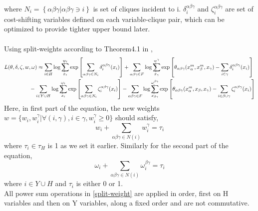 \documentclass{article}
\makeatletter
\newcommand{\avsum}{\mathop{\mathpalette\avsuminner\relax}\displaylimits}
\newcommand\avsuminner[2]{%
  {\sbox0{$\m@th#1\sum$}%
   \vphantom{\usebox0}%
   \ooalign{%
     \hidewidth
     \smash{\vrule height\dimexpr\ht0+1pt\relax depth\dimexpr\dp0+1pt\relax}%
     \hidewidth\cr
     $\m@th#1\sum$\cr
   }%
  }%
}
\makeatother
\begin{document}
where $N_i=\left\{ \alpha\beta\gamma | \alpha\beta\gamma \ni i \right\}$ is set of cliques incident to i. $\delta_i^{\alpha\beta\gamma}$ and $\zeta_i^{\alpha\beta\gamma}$ are set of cost-shifting variables defined on each variable-clique pair, which can be optimized to provide tighter upper bound later.\\\\
Using split-weights according to Theorem4.1 in \cite{Ping2015},
\begin{align}
 L(\theta,\delta,\zeta,w,\omega)&\approx \sum_{i\in H}\log\avsum_{x_i}^{w_i}\exp\left [ \sum_{\alpha\beta\gamma \in N_i} \delta_i^{\alpha\beta\gamma}(x_i)\right ] + \sum_{\alpha\beta\gamma \in F}\log\avsum_{x_{\gamma}}^{w^{\gamma}}\exp\left [\theta_{\alpha\beta\gamma}(x_{\alpha}^m,x_{\beta}^m,x_{\gamma})-\sum_{i\in \gamma}\delta_i^{\alpha\beta\gamma}(x_i) \right ] \nonumber \\ \label{split-weight}&\hspace{-5mm}- \sum_{i\in Y\cup H}\log\avsum_{x_i}^{\omega_i}\exp\left [ \sum_{\alpha\beta\gamma \in N_i} \zeta_i^{\alpha\beta\gamma}(x_i)\right ] - \sum_{\alpha\beta\gamma \in F}\log\avsum_{x_{\beta\gamma}}^{\omega^{\beta\gamma}}\exp\left [\theta_{\alpha\beta\gamma}(x_{\alpha}^m,x_{\beta},x_{\gamma})-\sum_{i\in \beta\cup \gamma}\zeta_i^{\alpha\beta\gamma}(x_i) \right ] 
\end{align}
Here, in first part of the equation, the new weights $w=\{w_i,w_i^{\gamma}|\forall(i,\gamma),i\in\gamma, w_i^{\gamma}\geq0\}$ should satisfy,
\begin{equation*}
w_i+\sum_{\alpha\beta\gamma\in N(i)}w_i^{\gamma}=\tau_i
\end{equation*}
where $\tau_i\in \tau_H$ is 1 as we set it earlier. Similarly for the second part of the equation,
\begin{equation*}
\omega_i+\sum_{\alpha\beta\gamma\in N(i)}\omega_i^{\beta\gamma}=\tau_i
\end{equation*}
where $i\in Y\cup H$ and $\tau_i$ is either 0 or 1.\\
All power sum operations in \ref{split-weight} are applied in order, first on H variables and then on Y variables, along a fixed order and are not commutative.\\
\end{document}
